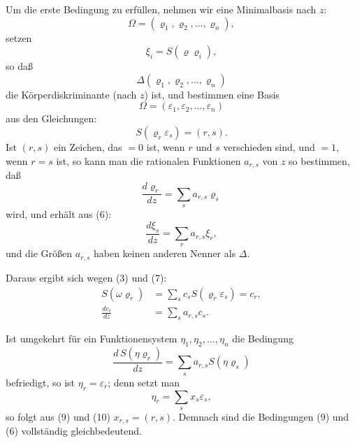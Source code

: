 \documentclass[12pt,a4paper]{article}
\begin{document}
Um die erste Bedingung zu erfüllen, nehmen wir eine Minimalbasis nach $z$:
\begin{equation}\label{eq:198-2}
\Omega = (\varrho_1, \varrho_2, \ldots, \varrho_n),
\end{equation}
setzen
\begin{equation}\label{eq:198-3}
\xi_i = S(\varrho \varrho_i),
\end{equation}
so daß
\begin{equation}\label{eq:198-4}
\Delta(\varrho_1, \varrho_2, \ldots, \varrho_n)
\end{equation}
die Körperdiskriminante (nach $z$) ist, und bestimmen eine Basis
\begin{equation}\label{eq:198-5}
\Omega = (\varepsilon_1, \varepsilon_2, \ldots, \varepsilon_n)
\end{equation}
aus den Gleichungen:
\begin{equation}\label{eq:198-6}
S(\varrho_r \varepsilon_s) = (r, s).
\end{equation}
Ist $(r, s)$ ein Zeichen, das $= 0$ ist, wenn $r$ und $s$ verschieden sind, und $= 1$, wenn $r = s$ ist, so kann man die rationalen Funktionen $a_{r,s}$ von $z$ so bestimmen, daß
\begin{equation}\label{eq:198-7}
\frac{d\varrho_r}{dz} = \sum_s a_{r,s} \varrho_s
\end{equation}
wird, und erhält aus (6):
\begin{equation}\label{eq:198-8}
\frac{d\xi_s}{dz} = \sum_r a_{r,s} \xi_r,
\end{equation}
und die Größen $a_{r,s}$ haben keinen anderen Nenner als $\Delta$.

Daraus ergibt sich wegen (3) und (7):
\begin{equation}\label{eq:198-9}
\begin{aligned}
S(\omega \varrho_r) &= \sum_s c_s S(\varrho_r \varepsilon_s) = c_r,\\
\frac{dc_r}{dz} &= \sum_s a_{r,s} c_s.
\end{aligned}
\end{equation}

Ist umgekehrt für ein Funktionensystem $\eta_1, \eta_2, \ldots, \eta_n$ die Bedingung
\begin{equation}\label{eq:198-10}
\frac{d\,S(\eta \varrho_r)}{dz} = \sum_s a_{r,s} S(\eta \varrho_s)
\end{equation}
befriedigt, so ist $\eta_r = \varepsilon_r$; denn setzt man
\[
\eta_r = \sum_s x_s \varepsilon_s,
\]
so folgt aus (9) und (10) $x_{r,s} = (r, s)$. Demnach sind die Bedingungen (9) und (6) vollständig gleichbedeutend.
\end{document}
